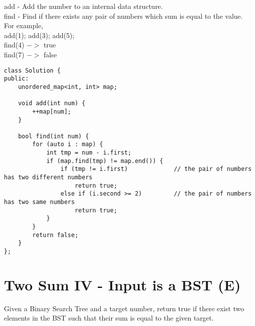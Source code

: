 add - Add the number to an internal data structure.\\
find - Find if there exists any pair of numbers which sum is equal to the value.\\

For example,\\
add(1); add(3); add(5);\\
find(4) $->$ true\\
find(7) $->$ false\\

\begin{lstlisting}
class Solution {
public:
    unordered_map<int, int> map;
    
    void add(int num) {
        ++map[num];
    }
    
    bool find(int num) {
        for (auto i : map) {
            int tmp = num - i.first;
            if (map.find(tmp) != map.end()) {       
                if (tmp != i.first)             // the pair of numbers has two different numbers
                    return true;
                else if (i.second >= 2)         // the pair of numbers has two same numbers
                    return true;
            }
        }
        return false;
    }
};
\end{lstlisting}

\section{Two Sum IV - Input is a BST (E)}
Given a Binary Search Tree and a target number, return true if there exist two elements in the BST such that their sum is equal to the given target.

